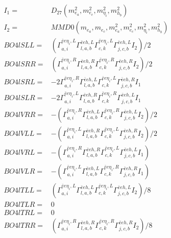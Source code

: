 \documentclass[A4,landscape]{article}
\begin{document}
\begin{align} 
I_1 = & D_{27}(m^2_{e_{{a}}}, m^2_{e_{{c}}}, m^2_{\eta_i}, m^2_{h_{{b}}}) \\ 
I_2 = & MMD0(m_{e_{{a}}}, m_{e_{{c}}}, m^2_{e_{{a}}}, m^2_{e_{{c}}}, m^2_{\eta_i}, m^2_{h_{{b}}}) \\ 
  BO4lSLL= & ( \Gamma^{\bar{e}e \eta_i ,L}_{a, i} \Gamma^{\bar{e}e h ,L}_{l, a, b} \Gamma^{\bar{e}e \eta_i ,L}_{c, k} \Gamma^{\bar{e}e h ,L}_{j, c, b} I_2)/2 \\ 
  BO4lSRR= & ( \Gamma^{\bar{e}e \eta_i ,R}_{a, i} \Gamma^{\bar{e}e h ,R}_{l, a, b} \Gamma^{\bar{e}e \eta_i ,R}_{c, k} \Gamma^{\bar{e}e h ,R}_{j, c, b} I_2)/2 \\ 
  BO4lSRL= & -2  \Gamma^{\bar{e}e \eta_i ,R}_{a, i} \Gamma^{\bar{e}e h ,L}_{l, a, b} \Gamma^{\bar{e}e \eta_i ,L}_{c, k} \Gamma^{\bar{e}e h ,R}_{j, c, b} I_1 \\ 
  BO4lSLR= & -2  \Gamma^{\bar{e}e \eta_i ,L}_{a, i} \Gamma^{\bar{e}e h ,R}_{l, a, b} \Gamma^{\bar{e}e \eta_i ,R}_{c, k} \Gamma^{\bar{e}e h ,L}_{j, c, b} I_1 \\ 
  BO4lVRR= & -( \Gamma^{\bar{e}e \eta_i ,R}_{a, i} \Gamma^{\bar{e}e h ,L}_{l, a, b} \Gamma^{\bar{e}e \eta_i ,R}_{c, k} \Gamma^{\bar{e}e h ,L}_{j, c, b} I_2)/2 \\ 
  BO4lVLL= & -( \Gamma^{\bar{e}e \eta_i ,L}_{a, i} \Gamma^{\bar{e}e h ,R}_{l, a, b} \Gamma^{\bar{e}e \eta_i ,L}_{c, k} \Gamma^{\bar{e}e h ,R}_{j, c, b} I_2)/2 \\ 
  BO4lVRL= & -( \Gamma^{\bar{e}e \eta_i ,R}_{a, i} \Gamma^{\bar{e}e h ,R}_{l, a, b} \Gamma^{\bar{e}e \eta_i ,L}_{c, k} \Gamma^{\bar{e}e h ,L}_{j, c, b} I_1) \\ 
  BO4lVLR= & -( \Gamma^{\bar{e}e \eta_i ,L}_{a, i} \Gamma^{\bar{e}e h ,L}_{l, a, b} \Gamma^{\bar{e}e \eta_i ,R}_{c, k} \Gamma^{\bar{e}e h ,R}_{j, c, b} I_1) \\ 
  BO4lTLL= & ( \Gamma^{\bar{e}e \eta_i ,L}_{a, i} \Gamma^{\bar{e}e h ,L}_{l, a, b} \Gamma^{\bar{e}e \eta_i ,L}_{c, k} \Gamma^{\bar{e}e h ,L}_{j, c, b} I_2)/8 \\ 
  BO4lTLR= & 0 \\ 
  BO4lTRL= & 0 \\ 
  BO4lTRR= & ( \Gamma^{\bar{e}e \eta_i ,R}_{a, i} \Gamma^{\bar{e}e h ,R}_{l, a, b} \Gamma^{\bar{e}e \eta_i ,R}_{c, k} \Gamma^{\bar{e}e h ,R}_{j, c, b} I_2)/8 \\ 
\end{align} 
\end{document}

